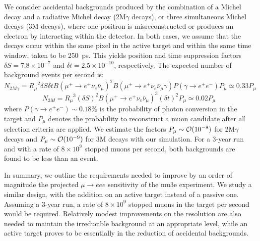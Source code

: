 We consider accidental backgrounds produced by the combination of a Michel decay and a radiative Michel decay (2M$\gamma$ decays), or three simultaneous Michel decays (3M decays), where one positron is misreconstructed or produces an electron by interacting within the detector. In both cases, we assume that
the decays occur within the same pixel in the active target and within the same time window, taken to be 250~ps. This yields position and time suppression factors $\delta S = 7.8\times 10^{-7}$ and $\delta t = 2.5\times 10^{-10}$, respectively. The expected number of background events per second is:
%
$$N_{2M\gamma} = {R_\mu}^2 \delta S \delta t {B(\mu^+ \rightarrow e^+ \nu_e \bar\nu_\mu)}^2 B(\mu^+ \rightarrow e^+ \nu_e \bar\nu_\mu \gamma) P(\gamma \rightarrow e^+ e^-)  P_\mu  \simeq 0.33 P_\mu$$
$$N_{3M} = {R_\mu}^3(\delta S)^2 {B(\mu^+ \rightarrow e^+ \nu_e \bar\nu_\mu)}^3 (\delta t)^2 P_\mu \simeq 0.02 P_\mu$$
%
where $P(\gamma \rightarrow e^+ e^-)\sim 0.18\%$ is the probability of photon conversion in the target and $P_\mu$ denotes the probability to reconstruct a muon candidate after all selection criteria are applied. We estimate the factors $P_\mu \sim {\cal O}(10^{-8})$ for 2M$\gamma$ decays and $P_\mu \sim {\cal O}(10^{-9})$ for 3M decays with our simulation. For a 3-year run and with a rate of $8\times 10^{9}$ stopped muons per second, both backgrounds are found to be less than an event.

In summary, we outline the requirements needed to improve by an order of magnitude the projected $\mu \rightarrow eee$ 
sensitivity of the mu3e experiment. We study a similar design, with the addition on an active target instead of a passive one. Assuming a 3-year run, a rate of $8\times 10^{9}$ stopped muons in the target per second would be required. Relatively modest improvements on the resolution are also needed to maintain the irreducible background at an appropriate level, while an active target proves to be essentially in the reduction of accidental 
backgrounds. 







